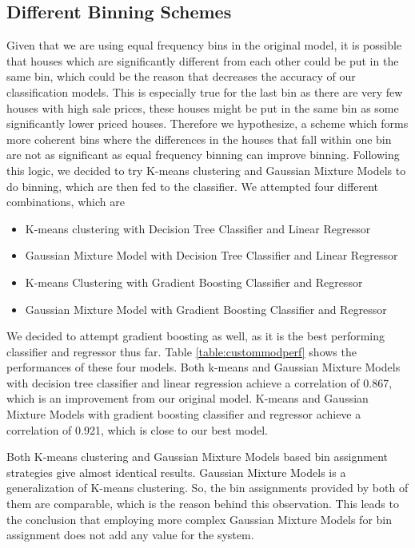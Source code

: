 \documentclass[conference,compsoc]{IEEEtran}
\begin{document}
\subsection {Different Binning Schemes}
Given that we are using equal frequency bins in the original model, it is possible that houses which are significantly different from each other could be put in the same bin, which could be the reason that decreases the accuracy of our classification models. This is especially true for the last bin as there are very few houses with high sale prices, these houses might be put in the same bin as some significantly lower priced houses. Therefore we hypothesize, a scheme which forms more coherent bins where the differences in the houses that fall within one bin are not as significant as equal frequency binning can improve binning. Following this logic, we decided to try K-means clustering and Gaussian Mixture Models to do binning, which are then fed to the classifier. We attempted four different combinations, which are

\begin {itemize}
  \item K-means clustering with Decision Tree Classifier and Linear Regressor
  \item Gaussian Mixture Model with Decision Tree Classifier and Linear Regressor
  \item K-means Clustering with Gradient Boosting Classifier and Regressor
  \item Gaussian Mixture Model with Gradient Boosting Classifier and Regressor
\end{itemize} 

\par
We decided to attempt gradient boosting as well, as it is the best performing classifier and regressor thus far. Table \ref{table:custommodperf} shows the performances of these four models.
Both k-means and Gaussian Mixture Models with decision tree classifier and linear regression achieve a correlation of 0.867, which is an improvement from our original model. K-means and Gaussian Mixture Models with gradient boosting classifier and regressor achieve a correlation of 0.921, which is close to our best model.

\par
Both K-means clustering and Gaussian Mixture Models based bin assignment strategies give almost identical results. Gaussian Mixture Models is a generalization of K-means clustering. So, the bin assignments provided by both of them are comparable, which is the reason behind this observation. This leads to the conclusion that employing more complex Gaussian Mixture Models for bin assignment does not add any value for the system.
\end{document}
